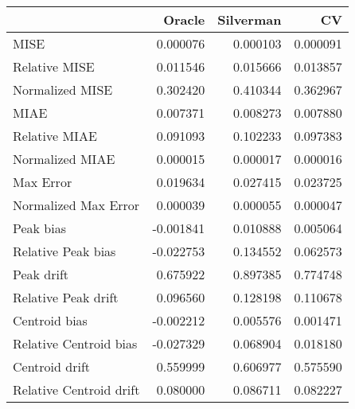 \begin{tabular}{lrrr}
  \hline
 & Oracle & Silverman & CV \\ 
  \hline
MISE & 0.000076 & 0.000103 & 0.000091 \\ 
  Relative MISE & 0.011546 & 0.015666 & 0.013857 \\ 
  Normalized MISE & 0.302420 & 0.410344 & 0.362967 \\ 
  MIAE & 0.007371 & 0.008273 & 0.007880 \\ 
  Relative MIAE & 0.091093 & 0.102233 & 0.097383 \\ 
  Normalized MIAE & 0.000015 & 0.000017 & 0.000016 \\ 
  Max Error & 0.019634 & 0.027415 & 0.023725 \\ 
  Normalized Max Error & 0.000039 & 0.000055 & 0.000047 \\ 
  Peak bias & -0.001841 & 0.010888 & 0.005064 \\ 
  Relative Peak bias & -0.022753 & 0.134552 & 0.062573 \\ 
  Peak drift & 0.675922 & 0.897385 & 0.774748 \\ 
  Relative Peak drift & 0.096560 & 0.128198 & 0.110678 \\ 
  Centroid bias & -0.002212 & 0.005576 & 0.001471 \\ 
  Relative Centroid bias & -0.027329 & 0.068904 & 0.018180 \\ 
  Centroid drift & 0.559999 & 0.606977 & 0.575590 \\ 
  Relative Centroid drift & 0.080000 & 0.086711 & 0.082227 \\ 
   \hline
\end{tabular}
